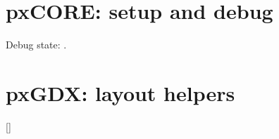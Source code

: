 \documentclass[fake,default]{P3CTeX}
\begin{document}
\section{pxCORE: setup and debug}

Debug state: .

\section{pxGDX: layout helpers}

[\linewidth]
\end{document}
